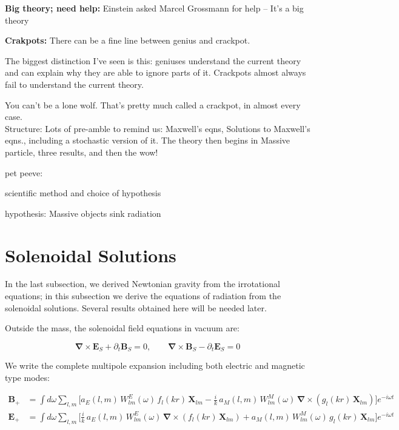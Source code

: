 \documentclass {article}
\renewcommand\vec{\mathbf}
\let\OldS\nabla
\renewcommand{\nabla}{\boldsymbol{\OldS}}
\begin{document}
\textbf{Big theory; need help:} Einstein asked Marcel Grossmann for help -- It's a big theory

\vspace{10pt}

\textbf{Crakpots:} There can be a fine line between genius and crackpot.

The biggest distinction I’ve seen is this: geniuses understand the current theory and can explain why they are able to ignore parts of it. Crackpots almost always fail to understand the current theory.

You can’t be a lone wolf. That’s pretty much called a crackpot, in almost every case.
\\[0.5in]

Structure: Lots of pre-amble to remind us: Maxwell's eqns, Solutions to Maxwell's eqns., including a stochastic version of it. The theory then begins in Massive particle, three results, and then the wow!

pet peeve:

scientific method and choice of hypothesis

hypothesis: Massive objects sink radiation


\newpage

\section{Solenoidal Solutions}

In the last subsection, we derived Newtonian gravity from the irrotational equations; in this subsection we derive the equations of radiation from the solenoidal solutions. Several results obtained here will be needed later.

Outside the mass, the solenoidal field equations in vacuum are:

\begin{equation}
\nabla \times \vec{E}_S + \partial_t \vec{B}_S = 0, \qquad
\nabla \times \vec{B}_S - \partial_t \vec{E}_S = 0
\end{equation}

We write the complete multipole expansion including both electric and magnetic type modes:

\begin{equation}
\begin{aligned}
\vec{B}_+ &= \int d\omega \sum_{l,m} \bigg[
a_E(l,m)\, W_{lm}^E(\omega)\, f_l(kr)\, \vec{X}_{lm}
- \frac{i}{k}\, a_M(l,m)\, W_{lm}^M(\omega)\, \nabla \times \left( g_l(kr)\, \vec{X}_{lm} \right)
\bigg] e^{-i\omega t} \\
\vec{E}_+ &= \int d\omega \sum_{l,m} \bigg[
\frac{i}{k}\, a_E(l,m)\, W_{lm}^E(\omega)\, \nabla \times \left( f_l(kr)\, \vec{X}_{lm} \right)
+ a_M(l,m)\, W_{lm}^M(\omega)\, g_l(kr)\, \vec{X}_{lm}
\bigg] e^{-i\omega t}
\end{aligned}
\end{equation}
\end{document}
